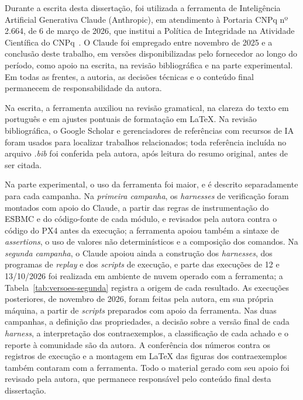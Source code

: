 {\small

Durante a escrita desta dissertação, foi utilizada a ferramenta de Inteligência Artificial Generativa Claude (Anthropic), em atendimento à Portaria CNPq nº 2.664, de 6 de março de 2026, que institui a Política de Integridade na Atividade Científica do CNPq~\cite{CNPq2026Portaria}. O Claude foi empregado entre novembro de 2025 e a conclusão deste trabalho, em versões disponibilizadas pelo fornecedor ao longo do período, como apoio na escrita, na revisão bibliográfica e na parte experimental. Em todas as frentes, a autoria, as decisões técnicas e o conteúdo final permanecem de responsabilidade da autora.

Na escrita, a ferramenta auxiliou na revisão gramatical, na clareza do texto em português e em ajustes pontuais de formatação em LaTeX. Na revisão bibliográfica, o Google Scholar e gerenciadores de referências com recursos de IA foram usados para localizar trabalhos relacionados; toda referência incluída no arquivo \textit{.bib} foi conferida pela autora, após leitura do resumo original, antes de ser citada.

Na parte experimental, o uso da ferramenta foi maior, e é descrito separadamente para cada campanha. Na \emph{primeira campanha}, os \textit{harnesses} de verificação foram montados com apoio do Claude, a partir das regras de instrumentação do ESBMC e do código-fonte de cada módulo, e revisados pela autora contra o código do PX4 antes da execução; a ferramenta apoiou também a sintaxe de \textit{assertions}, o uso de valores não determinísticos e a composição dos comandos. Na \emph{segunda campanha}, o Claude apoiou ainda a construção dos \textit{harnesses}, dos programas de \textit{replay} e dos \textit{scripts} de execução, e parte das execuções de 12 e 13/10/2026 foi realizada em ambiente de nuvem operado com a ferramenta; a Tabela~\ref{tab:versoes-segunda} registra a origem de cada resultado. As execuções posteriores, de novembro de 2026, foram feitas pela autora, em sua própria máquina, a partir de \textit{scripts} preparados com apoio da ferramenta. Nas duas campanhas, a definição das propriedades, a decisão sobre a versão final de cada \textit{harness}, a interpretação dos contraexemplos, a classificação de cada achado e o reporte à comunidade são da autora. A conferência dos números contra os registros de execução e a montagem em \LaTeX{} das figuras dos contraexemplos também contaram com a ferramenta. Todo o material gerado com seu apoio foi revisado pela autora, que permanece responsável pelo conteúdo final desta dissertação.



\par}

